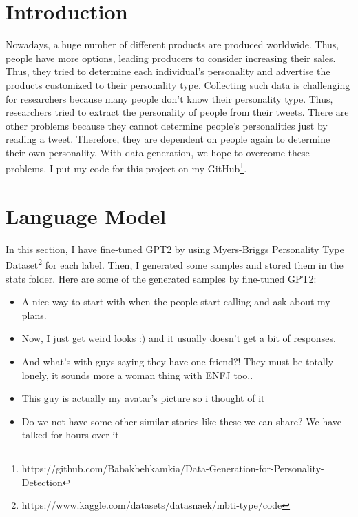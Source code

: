 \section{Introduction}
Nowadays, a huge number of different products are produced worldwide. Thus, people have more options, leading producers to consider increasing their sales. Thus, they tried to determine each individual's personality and advertise the products customized to their personality type. 
Collecting such data is challenging for researchers because many people don't know their personality type. Thus, researchers tried to extract the personality of people from their tweets. There are other problems because they cannot determine people's personalities just by reading a tweet. Therefore, they are dependent on people again to determine their own personality.
With data generation, we hope to overcome these problems. I put my code for this project on my GitHub\footnote{https://github.com/Babakbehkamkia/Data-Generation-for-Personality-Detection}.




\section{Language Model}
In this section, I have fine-tuned GPT2 by using Myers-Briggs Personality Type Dataset\footnote{https://www.kaggle.com/datasets/datasnaek/mbti-type/code} for each label. Then, I generated some samples and stored them in the stats folder. Here are some of the generated samples by fine-tuned GPT2: 
\begin{itemize}
    \item A nice way to start with when the people start calling and ask about my plans.
    \item Now, I just get weird looks :) and it usually doesn't get a bit of responses.
    \item And what's with guys saying they have one friend?! They must be totally lonely, it sounds more a woman thing with ENFJ too..
    \item This guy is actually my avatar's picture so i thought of it
    \item Do we not have some other similar stories like these we can share?  We have talked for hours over it
\end{itemize}



